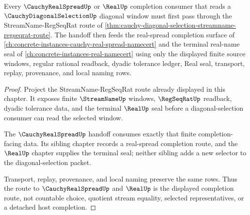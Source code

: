 \begin{theorem}
\label{thm:cauchy-diagonal-selection-real-spread-route}
Every $\CauchyRealSpreadUp$ or $\RealUp$ completion consumer that reads a $\CauchyDiagonalSelectionUp$ diagonal window must first pass through the StreamName-RegSeqRat route of \autoref{thm:cauchy-diagonal-selection-streamname-regseqrat-route}. The handoff then feeds the real-spread completion surface of \autoref{ch:concrete-instances-cauchy-real-spread-namecert} and the terminal real-name seal of \autoref{ch:concrete-instances-real-namecert} using only the displayed finite source windows, regular rational readback, dyadic tolerance ledger, Real seal, transport, replay, provenance, and local naming rows.
\end{theorem}
\begin{proof}
Project the StreamName-RegSeqRat route already displayed in this chapter. It exposes finite $\StreamNameUp$ windows, $\RegSeqRatUp$ readback, dyadic tolerance data, and the terminal $\RealUp$ seal before a diagonal-selection consumer can read the selected window.

The $\CauchyRealSpreadUp$ handoff consumes exactly that finite completion-facing data. Its sibling chapter records a real-spread completion route, and the $\RealUp$ chapter supplies the terminal seal; neither sibling adds a new selector to the diagonal-selection packet.

Transport, replay, provenance, and local naming preserve the same rows. Thus the route to $\CauchyRealSpreadUp$ and $\RealUp$ is the displayed completion route, not countable choice, quotient stream equality, selected representatives, or a detached host completion.
\end{proof}

